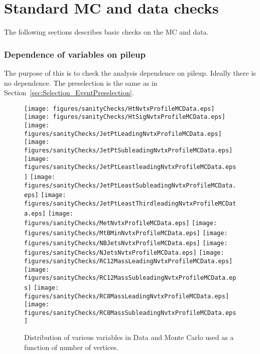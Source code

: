 
\chapter{Standard MC and data checks}

The following sections describes basic checks on the MC and data.

\label{sec:Standard_Checks}

\subsection{Dependence of variables on pileup}

The purpose of this is to check the analysis dependence on pileup.  Ideally there is no dependence.  The preselection is the same as in Section~\ref{sec:Selection_EventPreselection}.%


\begin{figure}[htbp]
\begin{center} 
\texttt{[image: figures/sanityChecks/HtNvtxProfileMCData.eps]}
\texttt{[image: figures/sanityChecks/HtSigNvtxProfileMCData.eps]}
\texttt{[image: figures/sanityChecks/JetPtLeadingNvtxProfileMCData.eps]}
\texttt{[image: figures/sanityChecks/JetPtSubleadingNvtxProfileMCData.eps]}
\texttt{[image: figures/sanityChecks/JetPtLeastleadingNvtxProfileMCData.eps]}
\texttt{[image: figures/sanityChecks/JetPtLeastSubleadingNvtxProfileMCData.eps]}
\texttt{[image: figures/sanityChecks/JetPtLeastThirdleadingNvtxProfileMCData.eps]}
\texttt{[image: figures/sanityChecks/MetNvtxProfileMCData.eps]}
\texttt{[image: figures/sanityChecks/MtBMinNvtxProfileMCData.eps]}
\texttt{[image: figures/sanityChecks/NBJetsNvtxProfileMCData.eps]}
\texttt{[image: figures/sanityChecks/NJetsNvtxProfileMCData.eps]}
\texttt{[image: figures/sanityChecks/RC12MassLeadingNvtxProfileMCData.eps]}
\texttt{[image: figures/sanityChecks/RC12MassSubleadingNvtxProfileMCData.eps]}
\texttt{[image: figures/sanityChecks/RC8MassLeadingNvtxProfileMCData.eps]}
\texttt{[image: figures/sanityChecks/RC8MassSubleadingNvtxProfileMCData.eps]}
\caption{Distribution of various variables in Data and Monte Carlo used as a function of number of vertices.}
\label{fig:Fit2ele}
\end{center}
\end{figure}

